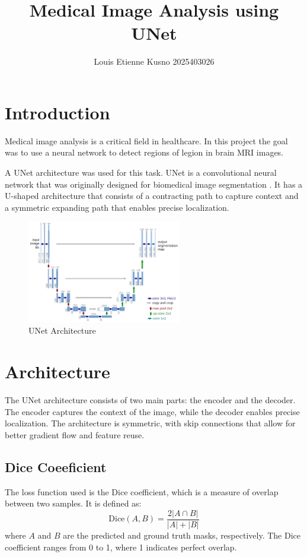 \documentclass[11pt,a4paper]{article}
\title{\textbf{Medical Image Analysis using UNet}}
\author{Louis Etienne Kusno 2025403026}
\date{}
\begin{document}
\maketitle

\section{Introduction}
Medical image analysis is a critical field in healthcare. In this project the goal was to use a neural network to detect regions of legion in brain MRI images.

A UNet architecture was used for this task. UNet is a convolutional neural network that was originally designed for biomedical image segmentation \cite{ronneberger2015u}. It has a U-shaped architecture that consists of a contracting path to capture context and a symmetric expanding path that enables precise localization.

\begin{figure}[H]
    \centering
    \includegraphics[width=0.6\textwidth]{./img/unet_architecture.png}
    \caption{UNet Architecture}
    \label{fig:unet_architecture}
\end{figure}

\section{Architecture}
The UNet architecture consists of two main parts: the encoder and the decoder. The encoder captures the context of the image, while the decoder enables precise localization. The architecture is symmetric, with skip connections that allow for better gradient flow and feature reuse.

\subsection{Dice Coeeficient}
The loss function used is the Dice coefficient, which is a measure of overlap between two samples. It is defined as:
\begin{equation}
    \text{Dice}(A, B) = \frac{2 |A \cap B|}{|A| + |B|}
\end{equation}
where \(A\) and \(B\) are the predicted and ground truth masks, respectively. The Dice coefficient ranges from 0 to 1, where 1 indicates perfect overlap.
\end{document}
